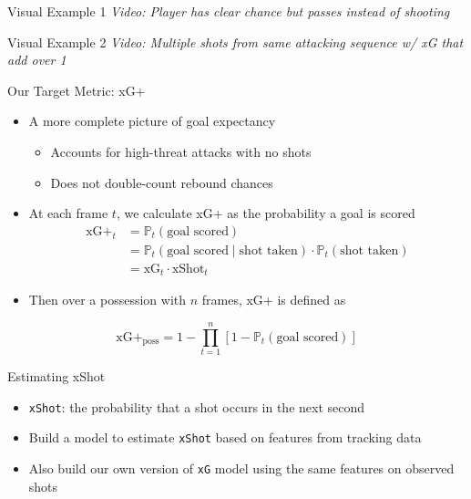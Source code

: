 \documentclass[
  11pt,
  ignorenonframetext,
]{beamer}
\providecommand{\tightlist}{%
  \setlength{\itemsep}{0pt}\setlength{\parskip}{0pt}}
\begin{document}
\begin{frame}{Visual Example 1}
\protect{}\label{visual-example-1}
\emph{Video: Player has clear chance but passes instead of shooting}
\end{frame}

\begin{frame}{Visual Example 2}
\protect{}\label{visual-example-2}
\emph{Video: Multiple shots from same attacking sequence w/ xG that add
over 1}
\end{frame}

\begin{frame}{Our Target Metric: xG+}
\protect{}\label{our-target-metric-xg}
\begin{itemize}
\tightlist
\item
  A more complete picture of goal expectancy

  \begin{itemize}
  \tightlist
  \item
    Accounts for high-threat attacks with no shots
  \item
    Does not double-count rebound chances
  \end{itemize}
\item
  At each frame \(t\), we calculate xG+ as the probability a goal is
  scored \[
  \begin{aligned}
  \text{xG+}_t &= \mathbb{P}_t(\text{goal scored}) \\
  &= \mathbb{P}_t(\text{goal scored} \mid \text{shot taken})\cdot\mathbb{P}_t(\text{shot taken}) \\
  &= \text{xG}_t\cdot\text{xShot}_t
  \end{aligned}
  \]
\item
  Then over a possession with \(n\) frames, xG+ is defined as
\end{itemize}

\[\text{xG+}_\text{poss} = 1 - \prod_{t = 1}^n \left[1 - \mathbb{P}_t\left(\text{goal scored}\right)\right]\]
\end{frame}

\begin{frame}[fragile]{Estimating xShot}
\protect{}\label{estimating-xshot}
\begin{itemize}
\tightlist
\item
  \texttt{xShot}: the probability that a shot occurs in the next second
\item
  Build a model to estimate \texttt{xShot} based on features from
  tracking data
\item
  Also build our own version of \texttt{xG} model using the same
  features on observed shots
\end{itemize}
\end{frame}
\end{document}
